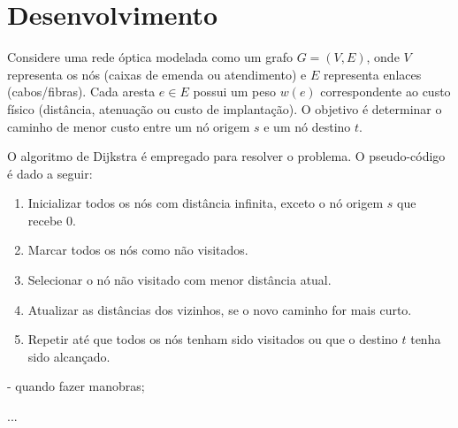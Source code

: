 \section{Desenvolvimento} \label{sec:algorithm}

Considere uma rede óptica modelada como um grafo $G=(V,E)$,
onde $V$ representa os nós (caixas de emenda ou atendimento) e $E$ representa enlaces (cabos/fibras).
Cada aresta $e \in E$ possui um peso $w(e)$ correspondente ao custo físico (distância, atenuação ou custo de implantação).
O objetivo é determinar o caminho de menor custo entre um nó origem $s$ e um nó destino $t$.

O algoritmo de Dijkstra é empregado para resolver o problema.
O pseudo-código é dado a seguir:

\begin{enumerate}
    \item Inicializar todos os nós com distância infinita, exceto o nó origem $s$ que recebe 0.
    \item Marcar todos os nós como não visitados.
    \item Selecionar o nó não visitado com menor distância atual.
    \item Atualizar as distâncias dos vizinhos, se o novo caminho for mais curto.
    \item Repetir até que todos os nós tenham sido visitados ou que o destino $t$ tenha sido alcançado.
\end{enumerate}

- quando fazer manobras;

...

